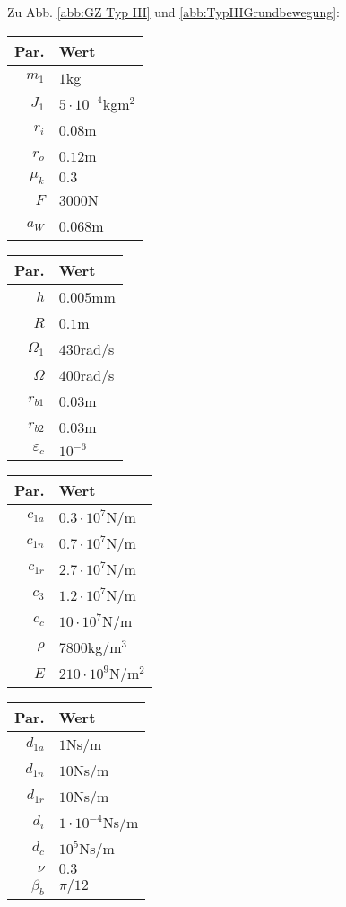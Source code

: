 Zu Abb. \ref{abb:GZ Typ III} und \ref{abb:TypIIIGrundbewegung}: 
\begin{center}
	\begin{tabular}{r|l}
		Par.&Wert\\\hline
		$m_1$&$1$kg\\
		$J_1$&$5\cdot10^{-4}$kgm$^2$\\
		$r_i$&$0.08$m\\
		$r_o$&$0.12$m\\
		$\mu_k$& $0.3$\\
		$F$&$3000$N\\
		$a_{W}$&$0.068$m\\
	\end{tabular}\hfill
	\begin{tabular}{r|l}
		Par.&Wert\\\hline
		$h$&$0.005$mm\\
		$R$&$0.1$m\\
		$\Omega_1$&$430$rad/s\\
		$\Omega$& $400$rad/s \\
		$r_{b1}$&$0.03$m\\
		$r_{b2}$&$0.03$m\\
		$\varepsilon_{c}$&$10^{-6}$\\
	\end{tabular}\hfill
	\begin{tabular}{r|l}
		Par.&Wert\\\hline
		$c_{1a}$&$0.3\cdot10^{7}$N/m\\
		$c_{1n}$&$0.7\cdot10^{7}$N/m\\
		$c_{1r}$&$2.7\cdot10^{7}$N/m\\
		$c_{3}$&$1.2\cdot10^{7}$N/m\\
		$c_{c}$&$10\cdot10^{7}$N/m\\
		$\rho$&$7800$kg/m$^3$\\
		$E$&$210\cdot10^9$N/m$^2$\\
	\end{tabular}\hfill
	\begin{tabular}{r|l}
		Par.&Wert\\\hline
		$d_{1a}$&$1$Ns/m\\
		$d_{1n}$&$10$Ns/m\\
		$d_{1r}$&$10$Ns/m\\
		$d_i$ &$1\cdot10^{-4}$Ns/m\\
		$d_c$ &$10^{5}$Ns/m\\
		$\nu$&$0.3$\\
		$\beta_b$&$\pi/12$
	\end{tabular}
\end{center}
